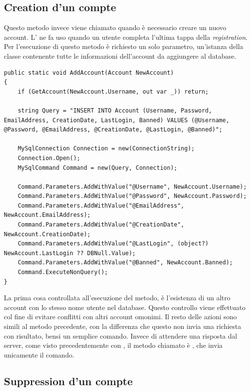 \documentclass[12pt]{report}
\begin{document}
\subsection{Creation d'un compte}
Questo metodo invece viene chiamato quando è necessario creare un nuovo account. L' ne fa uso quando un utente completa l'ultima tappa della \textit{registration}. Per l'esecuzione di questo metodo è richiesto un solo parametro, un'istanza della classe  contenente tutte le informazioni dell'account da aggiungere al database.

\begin{verbatim}
public static void AddAccount(Account NewAccount)
{
	if (GetAccount(NewAccount.Username, out var _)) return;
	
	string Query = "INSERT INTO Account (Username, Password, EmailAddress, CreationDate, LastLogin, Banned) VALUES (@Username, @Password, @EmailAddress, @CreationDate, @LastLogin, @Banned)";
	
	MySqlConnection Connection = new(ConnectionString);
	Connection.Open();
	MySqlCommand Command = new(Query, Connection);
	
	Command.Parameters.AddWithValue("@Username", NewAccount.Username);
	Command.Parameters.AddWithValue("@Password", NewAccount.Password);
	Command.Parameters.AddWithValue("@EmailAddress", NewAccount.EmailAddress);
	Command.Parameters.AddWithValue("@CreationDate", NewAccount.CreationDate);
	Command.Parameters.AddWithValue("@LastLogin", (object?) NewAccount.LastLogin ?? DBNull.Value);
	Command.Parameters.AddWithValue("@Banned", NewAccount.Banned);
	Command.ExecuteNonQuery();
}
\end{verbatim}

La prima cosa controllata all'esecuzione del metodo, è l'esistenza di un altro account con lo stesso nome utente nel database. Questo controllo viene effettuato col fine di evitare conflitti con altri account omonimi. Il resto delle azioni sono simili al metodo precedente, con la differenza che questo non invia una richiesta con risultato, bensi un semplice comando. Invece di attendere una risposta dal server, come visto precedentemente con , il metodo chiamato è , che invia unicamente il comando.

\subsection{Suppression d'un compte}
\end{document}
